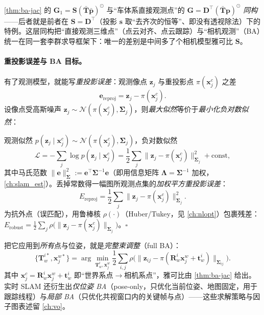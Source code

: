 \begin{insight}[最简点观测 = 相机观测的“去针孔”特例]
\cref{thm:ba-jac} 的 $\mathbf{G}_1=\mathbf{S}(\bar{\mathbf{T}}\bar{\mathbf{p}})^\odot$ 与“车体系直接观测点”的 $\mathbf{G}=\mathbf{D}^\top(\bar{\mathbf{T}}\mathbf{p})^\odot$ \emph{同构}——后者就是前者在 $\mathbf{S}=\mathbf{D}^\top$（投影 $\mathbf{s}$ 取“去齐次的恒等”、即没有透视除法）下的特例\cite{barfoot2024state}。这层同构把“直接观测三维点”（点云对齐、点云跟踪）与“相机观测”（BA）统一在同一套李群求导框架下：唯一的差别是中间多了个相机模型雅可比 $\mathbf{S}$。
\end{insight}

\paragraph{重投影误差与 BA 目标。}
有了观测模型，就能写\emph{重投影误差}\cite{carlone2026handbook}：观测像点 $\mathbf{z}_j$ 与重投影点 $\pi(\mathbf{x}_j^c)$ 之差
\begin{equation}
  \mathbf{e}_{\text{reproj}}=\mathbf{z}_j-\pi(\mathbf{x}_j^c).
  \label{eq:reproj-error}
\end{equation}
设像点受高斯噪声 $\mathbf{z}_j\sim\mathcal{N}(\pi(\mathbf{x}_j^c),\boldsymbol\Sigma_j)$，则\emph{最大似然}等价于\emph{最小化负对数似然}：

\begin{derivation}
观测似然 $p(\mathbf{z}_j\mid\mathbf{x}_j^c)\sim\mathcal{N}(\pi(\mathbf{x}_j^c),\boldsymbol\Sigma_j)$，负对数似然
\[
  \mathcal{L}=-\sum_j\log p(\mathbf{z}_j\mid\mathbf{x}_j^c)
  =\frac12\sum_j\big\|\mathbf{z}_j-\pi(\mathbf{x}_j^c)\big\|_{\boldsymbol\Sigma_j}^2+\text{const},
\]
其中马氏范数 $\|\mathbf{e}\|_{\boldsymbol\Sigma}^2:=\mathbf{e}^\top\boldsymbol\Sigma^{-1}\mathbf{e}$（即用信息矩阵 $\boldsymbol\Lambda=\boldsymbol\Sigma^{-1}$ 加权，\cref{ch:slam_est}）。丢掉常数得一幅图所观测点集的\emph{加权平方重投影误差}\cite{carlone2026handbook}：
\begin{equation}
  E_{\text{reproj}}=\frac12\sum_j\big\|\mathbf{z}_j-\pi(\mathbf{x}_j^c)\big\|_{\boldsymbol\Sigma_j}^2.
  \label{eq:reproj-cost}
\end{equation}
为抗外点（误匹配），用鲁棒核 $\rho(\cdot)$（Huber/Tukey，见 \cref{ch:nlopt}）包裹残差：$E_{\text{robust}}=\tfrac12\sum_j\rho\big(\|\mathbf{z}_j-\pi(\mathbf{x}_j^c)\|_{\boldsymbol\Sigma_j}\big)$。\hfill$\square$
\end{derivation}

\noindent 把它应用到\emph{所有}点与位姿，就是\emph{完整束调整}（full BA）\cite{carlone2026handbook}：
\begin{equation}
  \{\mathbf{T}_w^{i*},\mathbf{x}_j^{w*}\}=\arg\min_{\mathbf{T}_w^i,\mathbf{x}_j^w}
  \frac12\sum_{i,j}\rho\Big(\big\|\mathbf{z}_{ij}-\pi(\mathbf{R}_w^i\mathbf{x}_j^w+\mathbf{t}_w^i)\big\|_{\boldsymbol\Sigma_{ij}}\Big).
  \label{eq:full-ba}
\end{equation}
其中 $\mathbf{x}_j^c=\mathbf{R}_w^i\mathbf{x}_j^w+\mathbf{t}_w^i$ 即“世界系点$\to$相机系点”，雅可比由 \cref{thm:ba-jac} 给出。实时 SLAM 还衍生出\emph{仅位姿 BA}（pose-only，只优化当前位姿、地图固定，用于跟踪线程）与\emph{局部 BA}（只优化共视窗口内的关键帧与点）\cite{carlone2026handbook}——这些求解策略与因子图表述留 \cref{ch:vo}。

